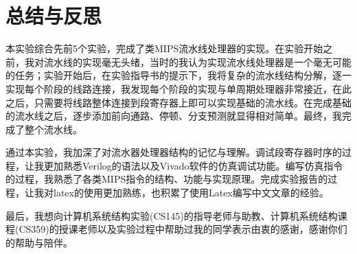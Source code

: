\documentclass[UTF8]{ctexart}
\begin{document}
\section{总结与反思}
本实验综合先前5个实验，完成了类MIPS流水线处理器的实现。在实验开始之前，我对流水线的实现毫无头绪，当时的我认为实现流水线处理器是一个毫无可能的任务；实验开始后，在实验指导书的提示下，我将复杂的流水线结构分解，逐一实现每个阶段的线路连接，我发现每个阶段的实现与单周期处理器非常接近，在此之后，只需要将线路整体连接到段寄存器上即可以实现基础的流水线。在完成基础的流水线之后，逐步添加前向通路、停顿、分支预测就显得相对简单。最终，我完成了整个流水线。\par
通过本实验，我加深了对流水器处理器结构的记忆与理解。调试段寄存器时序的过程，让我更加熟悉Verilog的语法以及Vivado软件的仿真调试功能。编写仿真指令的过程，我熟悉了各类MIPS指令的结构、功能与实现原理。完成实验报告的过程，让我对latex的使用更加熟练，也积累了使用Latex编写中文文章的经验。\par
最后，我想向计算机系统结构实验(CS145)的指导老师与助教、计算机系统结构课程(CS359)的授课老师以及实验过程中帮助过我的同学表示由衷的感谢，感谢你们的帮助与陪伴。
\end{document}
